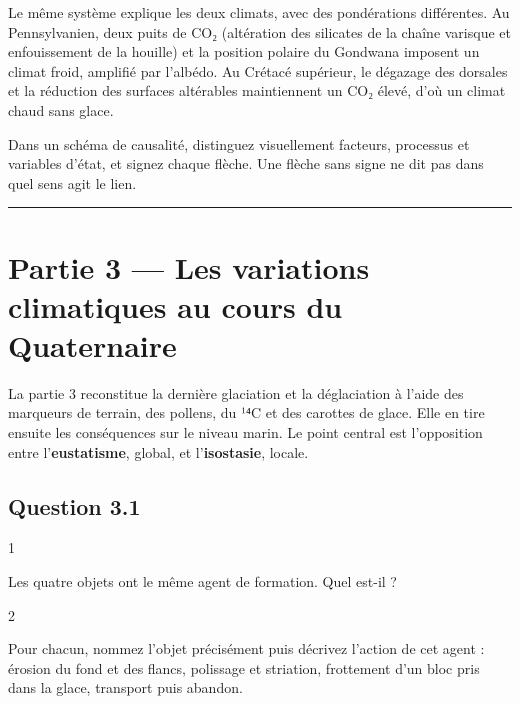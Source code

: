 \documentclass[11pt,a4paper]{article}
\begin{document}
Le même système explique les deux climats, avec des pondérations différentes. Au Pennsylvanien, deux puits de CO₂ (altération des silicates de la chaîne varisque et enfouissement de la houille) et la position polaire du Gondwana imposent un climat froid, amplifié par l'albédo. Au Crétacé supérieur, le dégazage des dorsales et la réduction des surfaces altérables maintiennent un CO₂ élevé, d'où un climat chaud sans glace.

\begin{methode}

Dans un schéma de causalité, distinguez visuellement facteurs, processus et variables d'état, et signez chaque flèche. Une flèche sans signe ne dit pas dans quel sens agit le lien.

\end{methode}

\begin{center}\rule{0.5\linewidth}{0.5pt}\end{center}

\hypertarget{partie-3-les-variations-climatiques-au-cours-du-quaternaire}{%
\section{Partie 3 --- Les variations climatiques au cours du Quaternaire}\label{partie-3-les-variations-climatiques-au-cours-du-quaternaire}}

La partie 3 reconstitue la dernière glaciation et la déglaciation à l'aide des marqueurs de terrain, des pollens, du ¹⁴C et des carottes de glace. Elle en tire ensuite les conséquences sur le niveau marin. Le point central est l'opposition entre l'\textbf{eustatisme}, global, et l'\textbf{isostasie}, locale.

\hypertarget{question-3.1}{%
\subsection{Question 3.1}\label{question-3.1}}

\begin{indication}{1}

Les quatre objets ont le même agent de formation. Quel est-il ?

\end{indication}

\begin{indication}{2}

Pour chacun, nommez l'objet précisément puis décrivez l'action de cet agent : érosion du fond et des flancs, polissage et striation, frottement d'un bloc pris dans la glace, transport puis abandon.

\end{indication}
\end{document}
